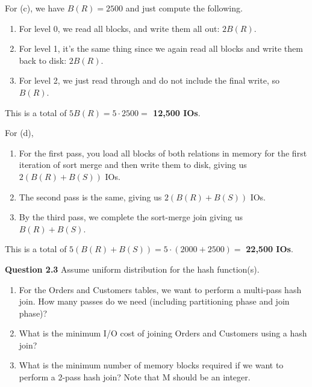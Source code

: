 \begin{example}
    For (c), we have $B(R) = 2500$ and just compute the following. 
    \begin{enumerate}
      \item For level $0$, we read all blocks, and write them all out: $2 B(R)$. 
      \item For level 1, it's the same thing since we again read all blocks and write them back to disk: $2 B(R)$. 
      \item For level 2, we just read through and do not include the final write, so $B(R)$.
    \end{enumerate}
    This is a total of \textbf{$5 B(R) = 5 \cdot 2500 =$ 12,500 IOs}. 

    For (d), 
    \begin{enumerate}
      \item For the first pass, you load all blocks of both relations in memory for the first iteration of sort merge and then write them to disk, giving us $2 (B(R) + B(S))$ IOs. 
      \item The second pass is the same, giving us $2 (B(R) + B(S))$ IOs. 
      \item By the third pass, we complete the sort-merge join giving us $B(R) + B(S)$. 
    \end{enumerate}
    This is a total of $5 (B(R) + B(S)) = 5 \cdot (2000 + 2500) =$ \textbf{22,500 IOs}. 

    \vspace{1em}
    \noindent\textbf{Question 2.3}
    Assume uniform distribution for the hash function(s).
    \begin{enumerate}[label=(\alph*)]
        \item For the Orders and Customers tables, we want to perform a multi-pass hash join. How many passes do we need (including partitioning phase and join phase)?
        
        \item What is the minimum I/O cost of joining Orders and Customers using a hash join?
        
        \item What is the minimum number of memory blocks required if we want to perform a 2-pass hash join? Note that M should be an integer.
    \end{enumerate}


\end{example}
